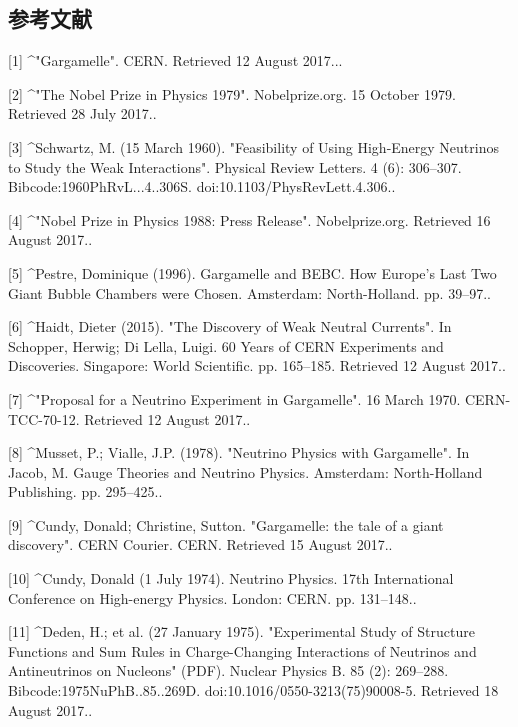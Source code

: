\subsection{参考文献}
[1]
^"Gargamelle". CERN. Retrieved 12 August 2017...

[2]
^"The Nobel Prize in Physics 1979". Nobelprize.org. 15 October 1979. Retrieved 28 July 2017..

[3]
^Schwartz, M. (15 March 1960). "Feasibility of Using High-Energy Neutrinos to Study the Weak Interactions". Physical Review Letters. 4 (6): 306–307. Bibcode:1960PhRvL...4..306S. doi:10.1103/PhysRevLett.4.306..

[4]
^"Nobel Prize in Physics 1988: Press Release". Nobelprize.org. Retrieved 16 August 2017..

[5]
^Pestre, Dominique (1996). Gargamelle and BEBC. How Europe's Last Two Giant Bubble Chambers were Chosen. Amsterdam: North-Holland. pp. 39–97..

[6]
^Haidt, Dieter (2015). "The Discovery of Weak Neutral Currents". In Schopper, Herwig; Di Lella, Luigi. 60 Years of CERN Experiments and Discoveries. Singapore: World Scientific. pp. 165–185. Retrieved 12 August 2017..

[7]
^"Proposal for a Neutrino Experiment in Gargamelle". 16 March 1970. CERN-TCC-70-12. Retrieved 12 August 2017..

[8]
^Musset, P.; Vialle, J.P. (1978). "Neutrino Physics with Gargamelle". In Jacob, M. Gauge Theories and Neutrino Physics. Amsterdam: North-Holland Publishing. pp. 295–425..

[9]
^Cundy, Donald; Christine, Sutton. "Gargamelle: the tale of a giant discovery". CERN Courier. CERN. Retrieved 15 August 2017..

[10]
^Cundy, Donald (1 July 1974). Neutrino Physics. 17th International Conference on High-energy Physics. London: CERN. pp. 131–148..

[11]
^Deden, H.; et al. (27 January 1975). "Experimental Study of Structure Functions and Sum Rules in Charge-Changing Interactions of Neutrinos and Antineutrinos on Nucleons" (PDF). Nuclear Physics B. 85 (2): 269–288. Bibcode:1975NuPhB..85..269D. doi:10.1016/0550-3213(75)90008-5. Retrieved 18 August 2017..